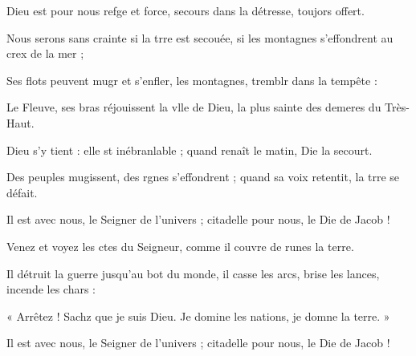 \item Dieu est pour nous refge et force,\psstar{} secours dans la détresse, toujors offert.
\item Nous serons sans crainte si la trre est secouée,\psstar{} si les montagnes s’effondrent au crex de la mer ;
\item Ses flots peuvent mugr et s’enfler,\psstar{} les montagnes, tremblr dans la tempête :
\item Le Fleuve, ses bras réjouissent la vlle de Dieu,\psstar{} la plus sainte des demeres du Très-Haut.
\item Dieu s’y tient : elle st inébranlable ;\psstar{} quand renaît le matin, Die la secourt.
\item Des peuples mugissent, des rgnes s’effondrent ;\psstar{} quand sa voix retentit, la trre se défait.
\item Il est avec nous, le Seigner de l’univers ;\psstar{} citadelle pour nous, le Die de Jacob !
\item Venez et voyez les ctes du Seigneur,\psstar{} comme il couvre de runes la terre.
\item Il détruit la guerre jusqu’au bot du monde,\psstar{} il casse les arcs, brise les lances, incende les chars :
\item « Arrêtez ! Sachz que je suis Dieu.\psstar{} Je domine les nations, je domne la terre. »
\item Il est avec nous, le Seigner de l’univers ;\psstar{} citadelle pour nous, le Die de Jacob !
